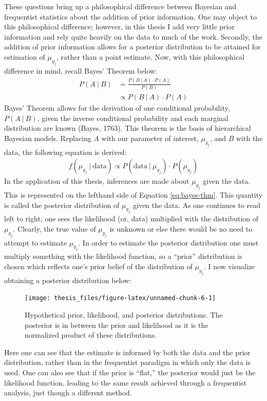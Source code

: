 \documentclass[12pt,twoside]{reedthesis}
\begin{document}
These questions bring up a philosophical difference between Bayesian and frequentist statistics about the addition of prior information. One may object to this philosophical difference; however, in this thesis I add very little prior information and rely quite heavily on the data to much of the work. Secondly, the addition of prior information allows for a posterior distribution to be attained for estimation of \(\mu_{y_j}\), rather than a point estimate. Now, with this philosophical difference in mind, recall Bayes' Theorem below:
\begin{align}
P(A ~\vert~ B) &= \frac{P(B ~\vert~ A) \cdot P(A)}{P(B)} \\
&\propto P(B ~\vert~ A) \cdot P(A)
\end{align}
Bayes' Theorem allows for the derivation of one conditional probability, \(P(A ~\vert~ B)\), given the inverse conditional probability and each marginal distribution are known (Bayes, 1763). This theorem is the basis of hierarchical Bayesian models. Replacing \(A\) with our parameter of interest, \(\mu_{y_j}\), and \(B\) with the data, the following equation is derived:
\begin{align}
f(\mu_{y_j} ~\vert~ \text{data}) \propto P(\text{data} ~\vert~ \mu_{y_j}) \cdot P(\mu_{y_j})
\label{eq:bayes-thm}
\end{align}
In the application of this thesis, inferences are made about \(\mu_{y_j}\) given the data. This is represented on the lefthand side of Equation \eqref{eq:bayes-thm}. This quantity is called the posterior distribution of \(\mu_{y_j}\) given the data. As one continues to read left to right, one sees the likelihood (or, data) multiplied with the distribution of \(\mu_{y_j}\). Clearly, the true value of \(\mu_{y_j}\) is unknown or else there would be no need to attempt to estimate \(\mu_{y_j}\). In order to estimate the posterior distribution one must multiply something with the likelihood function, so a ``prior'' distribution is chosen which reflects one's prior belief of the distribution of \(\mu_{y_j}\). I now visualize obtaining a posterior distribution below:
\clearpage
\begin{figure}
\texttt{[image: thesis\_files/figure-latex/unnamed-chunk-6-1]} \caption[Prior, likelihood, and posterior distributions.]{Hypothetical prior, likelihood, and posterior distributions. The posterior is in between the prior and likelihood as it is the normalized product of these distributions.}\label{fig:unnamed-chunk-6}
\end{figure}
Here one can see that the estimate is informed by both the data and the prior distribution, rather than in the frequentist paradigm in which only the data is used. One can also see that if the prior is ``flat,'' the posterior would just be the likelihood function, leading to the same result achieved through a frequentist analysis, just though a different method.
\end{document}
